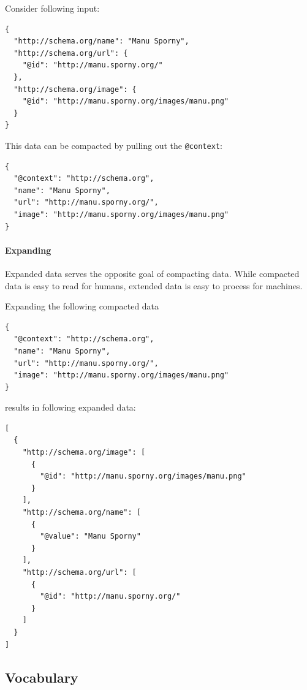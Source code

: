 Consider following input:

\lstset{language=JSON}
\begin{lstlisting}[caption=Verbose data of a person]
{
  "http://schema.org/name": "Manu Sporny",
  "http://schema.org/url": {
    "@id": "http://manu.sporny.org/"
  },
  "http://schema.org/image": {
    "@id": "http://manu.sporny.org/images/manu.png"
  }
}
\end{lstlisting}

This data can be compacted by pulling out the \lstinline{@context}:

\lstset{language=JSON}
\begin{lstlisting}[caption=Compacted and easy-to-read data of a person]
{
  "@context": "http://schema.org",
  "name": "Manu Sporny",
  "url": "http://manu.sporny.org/",
  "image": "http://manu.sporny.org/images/manu.png"
}
\end{lstlisting}

\paragraph{Expanding}\label{jsonldextending}

Expanded data serves the opposite goal of compacting data. While compacted data is easy to read for humans, extended data is easy to process for machines.

Expanding the following compacted data

\lstset{language=JSON}
\begin{lstlisting}[caption=Compacted and easy-to-read data of a person]
{
  "@context": "http://schema.org",
  "name": "Manu Sporny",
  "url": "http://manu.sporny.org/",
  "image": "http://manu.sporny.org/images/manu.png"
}
\end{lstlisting}

results in following expanded data:

\lstset{language=JSON}
\begin{lstlisting}[caption=Expanded data of a person that is easy to process for machines]
[
  {
    "http://schema.org/image": [
      {
        "@id": "http://manu.sporny.org/images/manu.png"
      }
    ],
    "http://schema.org/name": [
      {
        "@value": "Manu Sporny"
      }
    ],
    "http://schema.org/url": [
      {
        "@id": "http://manu.sporny.org/"
      }
    ]
  }
]
\end{lstlisting}

\subsection{Vocabulary}

